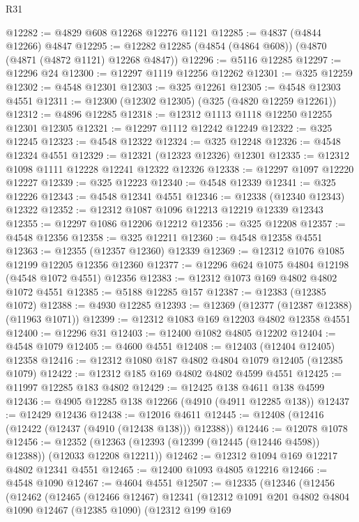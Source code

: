\begin{lexlean}{R31}
\begin{coremodule}
@12282 := @4829 @608 @12268 @12276 @1121
@12285 := @4837 (@4844 @12266) @4847
@12295 := @12282 @12285 (@4854 (@4864 @608)) (@4870 (@4871 (@4872 @1121) @12268 @4847))
@12296 := @5116 @12285
@12297 := @12296 @24
@12300 := @12297 @1119 @12256 @12262
@12301 := @325 @12259
@12302 := @4548 @12301
@12303 := @325 @12261
@12305 := @4548 @12303 @4551
@12311 := @12300 (@12302 @12305) (@325 (@4820 @12259 @12261))
@12312 := @4896 @12285
@12318 := @12312 @1113 @1118 @12250 @12255 @12301 @12305
@12321 := @12297 @1112 @12242 @12249
@12322 := @325 @12245
@12323 := @4548 @12322
@12324 := @325 @12248
@12326 := @4548 @12324 @4551
@12329 := @12321 (@12323 @12326) @12301
@12335 := @12312 @1098 @1111 @12228 @12241 @12322 @12326
@12338 := @12297 @1097 @12220 @12227
@12339 := @325 @12223
@12340 := @4548 @12339
@12341 := @325 @12226
@12343 := @4548 @12341 @4551
@12346 := @12338 (@12340 @12343) @12322
@12352 := @12312 @1087 @1096 @12213 @12219 @12339 @12343
@12355 := @12297 @1086 @12206 @12212
@12356 := @325 @12208
@12357 := @4548 @12356
@12358 := @325 @12211
@12360 := @4548 @12358 @4551
@12363 := @12355 (@12357 @12360) @12339
@12369 := @12312 @1076 @1085 @12199 @12205 @12356 @12360
@12377 := @12296 @624 @1075 @4804 @12198 (@4548 @1072 @4551) @12356
@12383 := @12312 @1073 @169 @4802 @4802 @1072 @4551
@12385 := @5188 @12285 @157
@12387 := @12383 (@12385 @1072)
@12388 := @4930 @12285
@12393 := @12369 (@12377 (@12387 @12388) (@11963 @1071))
@12399 := @12312 @1083 @169 @12203 @4802 @12358 @4551
@12400 := @12296 @31
@12403 := @12400 @1082 @4805 @12202
@12404 := @4548 @1079
@12405 := @4600 @4551
@12408 := @12403 (@12404 @12405) @12358
@12416 := @12312 @1080 @187 @4802 @4804 @1079 @12405 (@12385 @1079)
@12422 := @12312 @185 @169 @4802 @4802 @4599 @4551
@12425 := @11997 @12285 @183 @4802
@12429 := @12425 @138 @4611 @138 @4599
@12436 := @4905 @12285 @138 @12266 (@4910 (@4911 @12285 @138))
@12437 := @12429 @12436
@12438 := @12016 @4611
@12445 := @12408 (@12416 (@12422 (@12437 (@4910 (@12438 @138))) @12388))
@12446 := @12078 @1078
@12456 := @12352 (@12363 (@12393 (@12399 (@12445 (@12446 @4598)) @12388)) (@12033 @12208 @12211))
@12462 := @12312 @1094 @169 @12217 @4802 @12341 @4551
@12465 := @12400 @1093 @4805 @12216
@12466 := @4548 @1090
@12467 := @4604 @4551
@12507 := @12335
    (@12346
      (@12456
        (@12462
          (@12465
            (@12466 @12467)
            @12341
            (@12312
              @1091
              @201
              @4802
              @4804
              @1090
              @12467
              (@12385 @1090)
              (@12312
                @199
                @169

\end{coremodule}
\end{lexlean}
